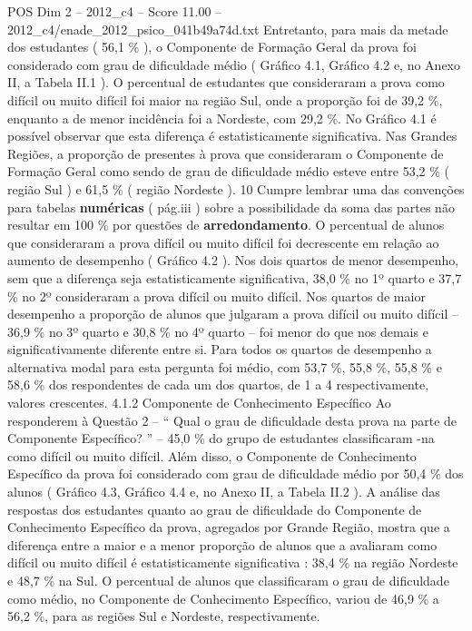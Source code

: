 \begin{textsample}{POS Dim 2 – 2012\_c4 – Score 11.00 – 2012\_c4/enade\_2012\_psico\_041b49a74d.txt}
Entretanto, para mais da metade dos estudantes ( 56,1 \% ), o Componente de Formação Geral da prova foi considerado com grau de dificuldade médio ( Gráfico 4.1, Gráfico 4.2 e, no Anexo II, a Tabela II.1 ).
O percentual de estudantes que consideraram a prova como difícil ou muito difícil foi maior na região Sul, onde a proporção foi de 39,2 \%, enquanto a de menor incidência foi a Nordeste, com 29,2 \%.
No Gráfico 4.1 é possível observar que esta diferença é estatisticamente significativa.
Nas Grandes Regiões, a proporção de presentes à prova que consideraram o Componente de Formação Geral como sendo de grau de dificuldade médio esteve entre 53,2 \% ( região Sul ) e 61,5 \% ( região Nordeste ). 10 Cumpre lembrar uma das convenções para tabelas \textbf{numéricas} ( pág.iii ) sobre a possibilidade da soma das partes não resultar em 100 \% por questões de \textbf{arredondamento}.
O percentual de alunos que consideraram a prova difícil ou muito difícil foi decrescente em relação ao aumento de desempenho ( Gráfico 4.2 ).
Nos dois quartos de menor desempenho, sem que a diferença seja estatisticamente significativa, 38,0 \% no 1º quarto e 37,7 \% no 2º consideraram a prova difícil ou muito difícil.
Nos quartos de maior desempenho a proporção de alunos que julgaram a prova difícil ou muito difícil – 36,9 \% no 3º quarto e 30,8 \% no 4º quarto – foi menor do que nos demais e significativamente diferente entre si.
Para todos os quartos de desempenho a alternativa modal para esta pergunta foi médio, com 53,7 \%, 55,8 \%, 55,8 \% e 58,6 \% dos respondentes de cada um dos quartos, de 1 a 4 respectivamente, valores crescentes. 4.1.2 Componente de Conhecimento Específico Ao responderem à Questão 2 – “ Qual o grau de dificuldade desta prova na parte de Componente Específico? ” – 45,0 \% do grupo de estudantes classificaram -na como difícil ou muito difícil.
Além disso, o Componente de Conhecimento Específico da prova foi considerado com grau de dificuldade médio por 50,4 \% dos alunos ( Gráfico 4.3, Gráfico 4.4 e, no Anexo II, a Tabela II.2 ).
A análise das respostas dos estudantes quanto ao grau de dificuldade do Componente de Conhecimento Específico da prova, agregados por Grande Região, mostra que a diferença entre a maior e a menor proporção de alunos que a avaliaram como difícil ou muito difícil é estatisticamente significativa : 38,4 \% na região Nordeste e 48,7 \% na Sul.
O percentual de alunos que classificaram o grau de dificuldade como médio, no Componente de Conhecimento Específico, variou de 46,9 \% a 56,2 \%, para as regiões Sul e Nordeste, respectivamente.

\end{textsample}
